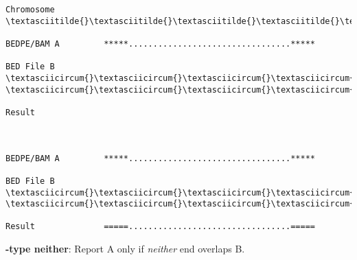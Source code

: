 \documentclass[letterpaper,10pt,english]{sphinxmanual}
\begin{document}
\begin{Verbatim}[commandchars=\\\{\}]
Chromosome  \textasciitilde{}\textasciitilde{}\textasciitilde{}\textasciitilde{}\textasciitilde{}\textasciitilde{}\textasciitilde{}\textasciitilde{}\textasciitilde{}\textasciitilde{}\textasciitilde{}\textasciitilde{}\textasciitilde{}\textasciitilde{}\textasciitilde{}\textasciitilde{}\textasciitilde{}\textasciitilde{}\textasciitilde{}\textasciitilde{}\textasciitilde{}\textasciitilde{}\textasciitilde{}\textasciitilde{}\textasciitilde{}\textasciitilde{}\textasciitilde{}\textasciitilde{}\textasciitilde{}\textasciitilde{}\textasciitilde{}\textasciitilde{}\textasciitilde{}\textasciitilde{}\textasciitilde{}\textasciitilde{}\textasciitilde{}\textasciitilde{}\textasciitilde{}\textasciitilde{}\textasciitilde{}\textasciitilde{}\textasciitilde{}\textasciitilde{}\textasciitilde{}\textasciitilde{}\textasciitilde{}\textasciitilde{}\textasciitilde{}\textasciitilde{}\textasciitilde{}\textasciitilde{}\textasciitilde{}\textasciitilde{}\textasciitilde{}\textasciitilde{}\textasciitilde{}\textasciitilde{}\textasciitilde{}\textasciitilde{}\textasciitilde{}\textasciitilde{}\textasciitilde{}\textasciitilde{}

BEDPE/BAM A         *****.................................*****

BED File B         \textasciicircum{}\textasciicircum{}\textasciicircum{}\textasciicircum{}\textasciicircum{}\textasciicircum{}\textasciicircum{}\textasciicircum{}                                          \textasciicircum{}\textasciicircum{}\textasciicircum{}\textasciicircum{}\textasciicircum{}\textasciicircum{}

Result



BEDPE/BAM A         *****.................................*****

BED File B         \textasciicircum{}\textasciicircum{}\textasciicircum{}\textasciicircum{}\textasciicircum{}\textasciicircum{}\textasciicircum{}\textasciicircum{}                                   \textasciicircum{}\textasciicircum{}\textasciicircum{}\textasciicircum{}\textasciicircum{}\textasciicircum{}

Result              =====.................................=====
\end{Verbatim}

\textbf{-type neither}: Report A only if \emph{neither} end overlaps B.
\end{document}
